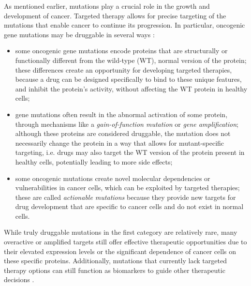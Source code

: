 As mentioned earlier, mutations play a crucial role in the growth and development of cancer. Targeted therapy allows for precise targeting of the mutations that enable cancer to continue its progression. In particular, oncogenic gene mutations may be druggable in several ways \cite{jci}:

\begin{itemize}
    \item some oncogenic gene mutations encode proteins that are structurally or functionally different from the wild-type (WT), normal version of the protein; these differences create an opportunity for developing targeted therapies, because a drug can be designed specifically to bind to these unique features, and inhibit the protein's activity, without affecting the WT protein in healthy cells;
    \item gene mutations often result in the abnormal activation of some protein, through mechanisms like a \textit{gain-of-function mutation} or \textit{gene amplification}; although these proteins are considered druggable, the mutation does not necessarily change the protein in a way that allows for mutant-specific targeting, i.e. drugs may also target the WT version of the protein present in healthy cells, potentially leading to more side effects;
    \item some oncogenic mutations create novel molecular dependencies or vulnerabilities in cancer cells, which can be exploited by targeted therapies; these are called \textit{actionable mutations} because they provide new targets for drug development that are specific to cancer cells and do not exist in normal cells.
\end{itemize}

While truly druggable mutations in the first category are relatively rare, many overactive or amplified targets still offer effective therapeutic opportunities due to their elevated expression levels or the significant dependence of cancer cells on these specific proteins. Additionally, mutations that currently lack targeted therapy options can still function as biomarkers to guide other therapeutic decisions \cite{jci}.

